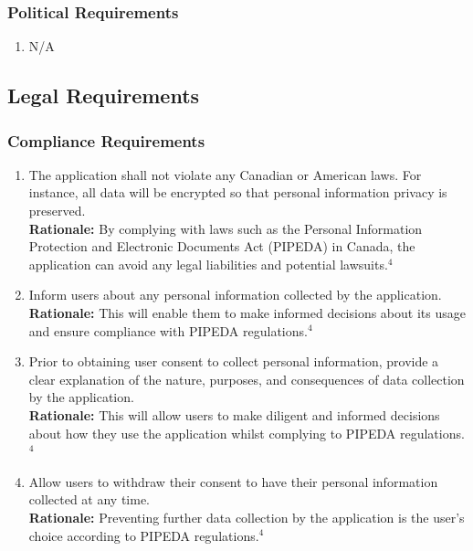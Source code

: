 \documentclass[]{article}
\begin{document}
\subsubsection{Political Requirements}
\label{ssub:political_requirements}
\begin{enumerate}[{CP-P}1. ]
	\item N/A
\end{enumerate}


\subsection{Legal Requirements}
\label{sub:legal_requirements}

\subsubsection{Compliance Requirements}
\label{ssub:compliance_requirements}
\begin{enumerate}[{LR-COMP}1. ]
	\item The application shall not violate any Canadian or American laws. For instance, all data will be encrypted so that personal information privacy is preserved.\\
	{\bf Rationale:} By complying with laws such as the Personal Information Protection and Electronic Documents Act (PIPEDA) in Canada, the application can avoid any legal liabilities and potential lawsuits.$^4$
	\item Inform users about any personal information collected by the application.\\
	{\bf Rationale:} This will enable them to make informed decisions about its usage and ensure compliance with PIPEDA regulations.$^4$
	\item Prior to obtaining user consent to collect personal information, provide a clear explanation of the nature, purposes, and consequences of data collection by the application.\\
	{\bf Rationale:} This will allow users to make diligent and informed decisions about how they use the application whilst complying to PIPEDA regulations.$^4$
	\item Allow users to withdraw their consent to have their personal information collected at any time.\\
	{\bf Rationale:} Preventing further data collection by the application is the user's choice according to PIPEDA regulations.$^4$
\end{enumerate}
\end{document}
